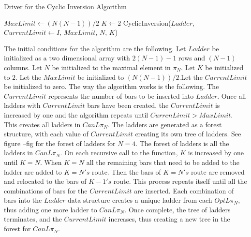 \begin{algorithm}
  \caption{Driver for the Cyclic Inversion Algorithm}
  \begin{algorithmic}[1]
      \State $MaxLimit \gets (N(N-1))/2$
      \State $K \gets 2$
        \State CyclicInversion($Ladder$, $CurrentLimit \gets I$, $MaxLimit$, $N$, $K$)

      \EndFor

    \EndFunction
  \end{algorithmic}
\end{algorithm}\pagebreak

The initial conditions for the algorithm are the following. Let $Ladder$ be initialized as a two dimensional array with $2(N-1)-1$ rows and $(N-1)$ columns.  Let $N$ be initialized to the maximal element in $\pi_{N}$. Let $K$ be initialized to $2$.
Let the $MaxLimit$ be initialized to $(N(N-1))/2$.Let the $CurrentLimit$ be initialized to zero. The way the algorithm works is the following. The $CurrentLimit$ 
represents the number of bars to be inserted into $Ladder$. Once all ladders with $CurrentLimit$ bars have been created, the $CurrentLimit$ is increased by one 
and the algorithm repeats until $CurrenLimit > MaxLimit$. This creates all ladders in $CanL{\pi_{N}}$. The ladders are generated as a forest structure,
 with each value of $CurrentLimit$ creating its own tree of ladders. See figure --fig for the 
forest of ladders for $N=4$. The forest of ladders is all the ladders in $CanL{\pi_{N}}$. On each recursive call to the function, $K$ is increased by one until $K=N$. When $K=N$ all the remaining bars that need to 
be added to the ladder are added to $K=N's$ route. Then the bars of $K=N's$ route are removed and relocated to the bars of $K-1's$ route. This process 
repeats itself until all the combinations of bars for the $CurrentLimit$ are inserted. Each combination of bars into the $Ladder$ 
data structure creates a unique ladder from each $OptL{\pi_{N}}$, thus adding one more ladder to $CanL{\pi_{N}}$.
Once complete, the tree of ladders terminates, and the $CurrentLimit$ increases, thus creating a new tree in the forest for 
$CanL{\pi_{N}}$.\pagebreak

